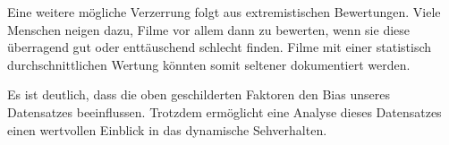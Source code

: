 Eine weitere mögliche Verzerrung folgt aus extremistischen Bewertungen.
Viele Menschen neigen dazu, Filme vor allem dann zu bewerten, wenn sie diese überragend gut oder enttäuschend schlecht finden.
Filme mit einer statistisch durchschnittlichen Wertung könnten somit seltener dokumentiert werden.

Es ist deutlich, dass die oben geschilderten Faktoren den Bias unseres Datensatzes beeinflussen.
Trotzdem ermöglicht eine Analyse dieses Datensatzes einen wertvollen Einblick in das dynamische Sehverhalten.
